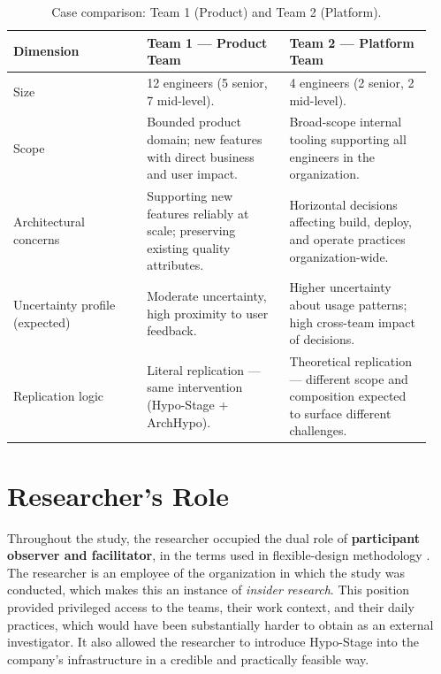 \begin{table}[htbp]
\centering
\caption{Case comparison: Team 1 (Product) and Team 2 (Platform).}
\label{tab:case-comparison}
\begin{tabular}{p{0.30\linewidth} p{0.32\linewidth} p{0.32\linewidth}}
\toprule
\textbf{Dimension} & \textbf{Team 1 --- Product Team} & \textbf{Team 2 --- Platform Team} \\
\midrule
Size & 12 engineers (5 senior, 7 mid-level). & 4 engineers (2 senior, 2 mid-level). \\
\midrule
Scope & Bounded product domain; new features with direct business and user impact. & Broad-scope internal tooling supporting all engineers in the organization. \\
\midrule
Architectural concerns & Supporting new features reliably at scale; preserving existing quality attributes. & Horizontal decisions affecting build, deploy, and operate practices organization-wide. \\
\midrule
Uncertainty profile (expected) & Moderate uncertainty, high proximity to user feedback. & Higher uncertainty about usage patterns; high cross-team impact of decisions. \\
\midrule
Replication logic & Literal replication --- same intervention (Hypo-Stage + ArchHypo). & Theoretical replication --- different scope and composition expected to surface different challenges. \\
\bottomrule
\end{tabular}
\end{table}

\section{Researcher's Role}
\label{sec:researcher-role}

Throughout the study, the researcher occupied the dual role of
\textbf{participant observer and facilitator}, in the terms used in flexible-design methodology \citep{robson2016}.
The researcher is an employee of the organization in which the study was conducted, which makes this an instance of \emph{insider research}.
This position provided privileged access to the teams, their work context, and their daily practices, which would have been substantially harder to
obtain as an external investigator. It also allowed the researcher to introduce
Hypo-Stage into the company's infrastructure in a credible and practically feasible
way.

